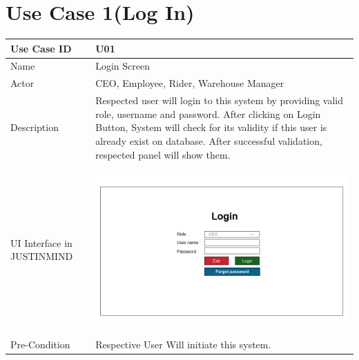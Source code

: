 \documentclass[12pt,a4paper]{report}
\begin{document}
\section{Use Case 1(Log In)}
\begin{tabular}{ | m{3cm} | m{12cm}| } 
  \hline
Use Case ID & U01   \\\hline
Name  &  Login Screen \\ \hline
Actor &   CEO, Employee, Rider, Warehouse Manager \\ \hline
Description & Respected user will login to this system by providing valid role, username and password. After clicking on Login Button, System will check for its validity if this user is already exist on database. After successful validation, respected panel will show them.  \\ \hline
UI Interface in JUSTINMIND & \begin{center}
\includegraphics[scale=0.3]{./UIs for Latex Reports/UI-002 Login@1x.png}
\end{center}  \\ \hline
Pre-Condition & Respective User Will initiate this system.  \\ \hline

\end{tabular}
\newpage
\end{document}
